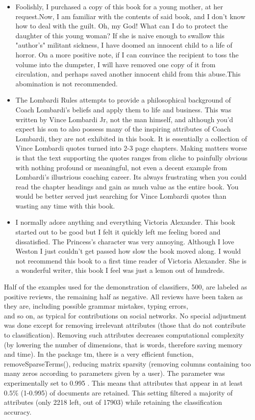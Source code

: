 \documentclass[11pt,openany,executivepaper]{book}
\begin{document}
\begin{itemize}
  \item Foolishly, I purchased a copy of this book for a young mother, at her request.Now, I am familiar with the contents of said book, and I don't know how to deal with the guilt. Oh, my God! What can I do to protect the daughter of this young woman? If she is naive enough to swallow this "author's" militant sickness, I have doomed an innocent child to a life of horror. On a more positive note, if I can convince the recipient to toss the volume into the dumpster, I will have removed one copy of it from circulation, and perhaps saved another innocent child from this abuse.This abomination is not recommended.
  \item The Lombardi Rules attempts to provide a philosophical background of Coach Lombardi's beliefs and apply them to life and business. This was written by Vince Lombardi Jr, not the man himself, and although you'd expect his son to also possess many of the inspiring attributes of Coach Lombardi, they are not exhibited in this book. It is essentially a collection of Vince Lombardi quotes turned into 2-3 page chapters. Making matters worse is that the text supporting the quotes ranges from cliche to painfully obvious with nothing profound or meaningful, not even a decent example from Lombardi's illustrious coaching career. Its always frustrating when you could read the chapter headings and gain as much value as the entire book. You would be better served just searching for Vince Lombardi quotes than wasting any time with this book.
  \item I normally adore anything and everything Victoria Alexander. This book started out to be good but I felt it quickly left me feeling bored and dissatisfied. The Princess's character was very annoying. Although I love Weston I just couldn't get passed how slow the book moved along. I would not recommend this book to a first time reader of Victoria Alexander. She is a wonderful writer, this book I feel was just a lemon out of hundreds.
\end{itemize}

Half of the examples used for the demonstration of classifiers, 500, are labeled as positive reviews, the remaining half as negative. All reviews have been taken as they are, including possible grammar mistakes, typing errors,\\
and so on, as typical for contributions on social networks. No special adjustment was done except for removing irrelevant attributes (those that do not contribute to classification). Removing such attributes decreases computational complexity (by lowering the number of dimensions, that is words, therefore saving memory and time). In the package tm, there is a very efficient function, removeSparseTerms(), reducing matrix sparsity (removing columns containing too many zeros according to parameters given by a user). The parameter was experimentally set to 0.995 . This means that attributes that appear in at least $0.5 \%$ (1-0.995) of documents are retained. This setting filtered a majority of attributes (only 2218 left, out of 17903) while retaining the classification accuracy.
\end{document}
